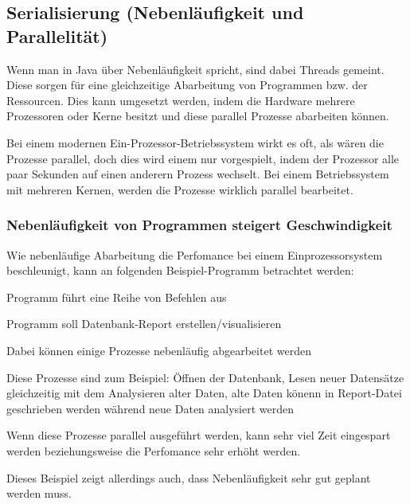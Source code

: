 


\subsection{Serialisierung (Nebenläufigkeit und Parallelität)}
Wenn man in Java über Nebenläufigkeit spricht, sind dabei Threads gemeint. Diese sorgen für eine gleichzeitige Abarbeitung von Programmen bzw. der Ressourcen. Dies kann umgesetzt werden, indem die Hardware mehrere Prozessoren oder Kerne besitzt und diese parallel Prozesse abarbeiten können.

Bei einem modernen Ein-Prozessor-Betriebssystem wirkt es oft, als wären die Prozesse parallel, doch dies wird einem nur vorgespielt, indem der Prozessor alle paar Sekunden auf einen anderern Prozess wechselt. Bei einem Betriebssystem mit mehreren Kernen, werden die Prozesse wirklich parallel bearbeitet. 

\subsubsection{Nebenläufigkeit von Programmen steigert Geschwindigkeit}
Wie nebenläufige Abarbeitung die Perfomance bei einem Einprozessorsystem beschleunigt, kann an folgenden Beispiel-Programm betrachtet werden:

\begin{compactitem}
    \item Programm führt eine Reihe von Befehlen aus
    \item Programm soll Datenbank-Report erstellen/visualisieren     
    \item Dabei können einige Prozesse nebenläufig abgearbeitet werden
    \item Diese Prozesse sind zum Beispiel: Öffnen der Datenbank, Lesen neuer Datensätze gleichzeitig mit dem Analysieren alter Daten, alte Daten könenn in Report-Datei geschrieben werden während neue Daten analysiert werden
    \item Wenn diese Prozesse parallel ausgeführt werden, kann sehr viel Zeit eingespart werden beziehungsweise die Perfomance sehr erhöht werden.
    \item Dieses Beispiel zeigt allerdings auch, dass Nebenläufigkeit sehr gut geplant werden muss.
\end{compactitem}


